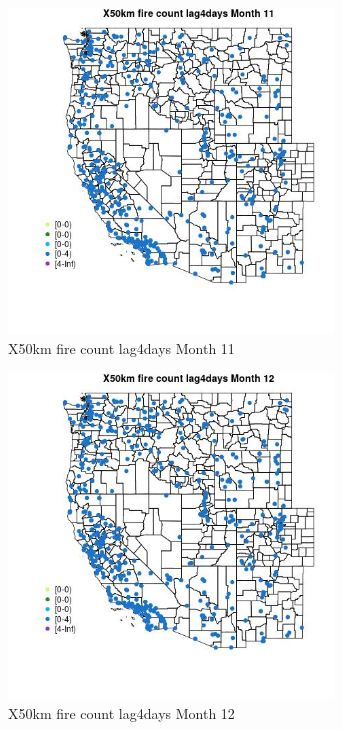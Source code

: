 \begin{figure} 
\centering  
\includegraphics[width=0.77\textwidth]{Code_Outputs/Report_ML_input_PM25_Step4_part_e_de_duplicated_aves_compiled_2019-05-14wNAs_MapObsMo11X50km_fire_count_lag4days.jpg} 
\caption{\label{fig:Report_ML_input_PM25_Step4_part_e_de_duplicated_aves_compiled_2019-05-14wNAsMapObsMo11X50km_fire_count_lag4days}X50km fire count lag4days Month 11} 
\end{figure} 
 

\clearpage 

\begin{figure} 
\centering  
\includegraphics[width=0.77\textwidth]{Code_Outputs/Report_ML_input_PM25_Step4_part_e_de_duplicated_aves_compiled_2019-05-14wNAs_MapObsMo12X50km_fire_count_lag4days.jpg} 
\caption{\label{fig:Report_ML_input_PM25_Step4_part_e_de_duplicated_aves_compiled_2019-05-14wNAsMapObsMo12X50km_fire_count_lag4days}X50km fire count lag4days Month 12} 
\end{figure} 
 

